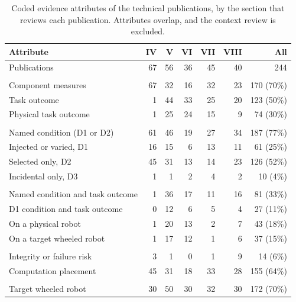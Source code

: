 \begin{table}[!ht]
\centering
\caption{Coded evidence attributes of the \CoreCount{} technical publications, by the section that reviews each publication. Attributes overlap, and the context review is excluded.}
\label{tab:evaluation}
\surveytableformat
\setlength{\tabcolsep}{3.2pt}
\renewcommand{\arraystretch}{1.04}
\begin{tabularx}{\linewidth}{@{}Yrrrrrr@{}}
\toprule
\textbf{Attribute} & \textbf{IV} & \textbf{V} & \textbf{VI} & \textbf{VII} & \textbf{VIII} & \textbf{All} \\
\midrule
Publications & 67 & 56 & 36 & 45 & 40 & 244 \\
\addlinespace[2pt]
 \\
Component measures & 67 & 32 & 16 & 32 & 23 & 170 (70\%) \\
Task outcome & 1 & 44 & 33 & 25 & 20 & 123 (50\%) \\
Physical task outcome & 1 & 25 & 24 & 15 & 9 & 74 (30\%) \\
\addlinespace[2pt]
 \\
Named condition (D1 or D2) & 61 & 46 & 19 & 27 & 34 & 187 (77\%) \\
Injected or varied, D1 & 16 & 15 & 6 & 13 & 11 & 61 (25\%) \\
Selected only, D2 & 45 & 31 & 13 & 14 & 23 & 126 (52\%) \\
Incidental only, D3 & 1 & 1 & 2 & 4 & 2 & 10 (4\%) \\
\addlinespace[2pt]
 \\
Named condition and task outcome & 1 & 36 & 17 & 11 & 16 & 81 (33\%) \\
D1 condition and task outcome & 0 & 12 & 6 & 5 & 4 & 27 (11\%) \\
On a physical robot & 1 & 20 & 13 & 2 & 7 & 43 (18\%) \\
On a target wheeled robot & 1 & 17 & 12 & 1 & 6 & 37 (15\%) \\
\addlinespace[2pt]
 \\
Integrity or failure risk & 3 & 1 & 0 & 1 & 9 & 14 (6\%) \\
Computation placement & 45 & 31 & 18 & 33 & 28 & 155 (64\%) \\
\addlinespace[2pt]
 \\
Target wheeled robot & 30 & 50 & 30 & 32 & 30 & 172 (70\%) \\

\end{tabularx}
\end{table}
